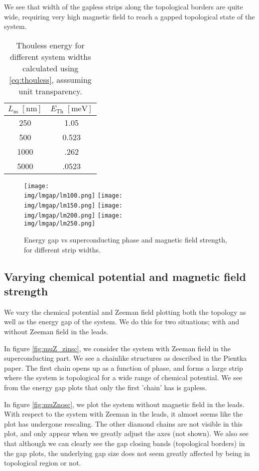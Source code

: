 \documentclass[10pt,a4paper]{article}
\newcommand{\img}{./images}
\begin{document}
	 We see that width of the gapless strips along the topological borders are quite wide, requiring very high magnetic field to reach a gapped topological state of the system.
	\begin{table}[H]
		\centering
		\begin{tabular}{|c|c|}
			\hline 
			$L_\text{m} \; [\si{\nm}]$ & $E_\text{Th} \; [\si{\meV}]$ \\ 
			\hline 
			250 & 1.05 \\ 
			\hline 
			500 & 0.523 \\ 
			\hline 
			1000 & .262 \\ 
			\hline 
			5000 & .0523 \\ 
			\hline 
		\end{tabular} 
		\caption{Thouless energy for different system widths calculated using \ref{eq:thouless}, asssuming unit transparency.}
		\label{table:thouless}
	\end{table}
	
	
	\begin{figure}[H]
		\texttt{[image: \\img/lmgap/lm100.png]}
		\texttt{[image: \\img/lmgap/lm150.png]}
		\texttt{[image: \\img/lmgap/lm200.png]}
		\texttt{[image: \\img/lmgap/lm250.png]}
		\caption{Energy gap vs superconducting phase and magnetic field strength, for different strip widths.}
		\label{fig:lmZPgap}
	\end{figure}
\newpage	
	\subsection{Varying chemical potential and magnetic field strength}
		We vary the chemical potential and Zeeman field plotting both the topology as well as the energy gap of the system.
		We do this for two situations; with and without Zeeman field in the leads.
		
		In figure \ref{fig:muZ_zinsc}, we consider the system with Zeeman field in the superconducting part.
		We see a chainlike structures as described in the Pientka paper.
		The first chain opens up as a function of phase, and forms a large strip where the system is topological for a wide range of chemical potential.
		We see from the energy gap plots that only the first 'chain' has is gapless.
		
		In figure \ref{fig:muZnosc}, we plot the system without magnetic field in the leads.
		With respect to the system with Zeeman in the leads, it almost seems like the plot has undergone rescaling.
		The other diamond chains are not visible in this plot, and only appear when we greatly adjust the axes (not shown).
		We also see that although we can clearly see the gap closing bands (topological borders) in the gap plots, the underlying gap size does not seem greatly affected by being in topological region or not.
\end{document}
